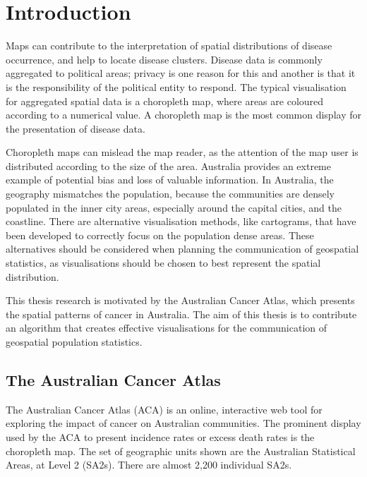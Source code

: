 \documentclass{monashthesis}
\begin{document}
\hypertarget{intro1}{%
\chapter{Introduction}\label{intro1}}

Maps can contribute to the interpretation of spatial distributions of disease occurrence, and help to locate disease clusters. Disease data is commonly aggregated to political areas; privacy is one reason for this and another is that it is the responsibility of the political entity to respond. The typical visualisation for aggregated spatial data is a choropleth map, where areas are coloured according to a numerical value. A choropleth map is the most common display for the presentation of disease data.

Choropleth maps can mislead the map reader, as the attention of the map user is distributed according to the size of the area. Australia provides an extreme example of potential bias and loss of valuable information. In Australia, the geography mismatches the population, because the communities are densely populated in the inner city areas, especially around the capital cities, and the coastline. There are alternative visualisation methods, like cartograms, that have been developed to correctly focus on the population dense areas. These alternatives should be considered when planning the communication of geospatial statistics, as visualisations should be chosen to best represent the spatial distribution.

This thesis research is motivated by the Australian Cancer Atlas, which presents the spatial patterns of cancer in Australia. The aim of this thesis is to contribute an algorithm that creates effective visualisations for the communication of geospatial population statistics.

\hypertarget{the-australian-cancer-atlas}{%
\section{The Australian Cancer Atlas}\label{the-australian-cancer-atlas}}

The Australian Cancer Atlas (ACA) is an online, interactive web tool for exploring the impact of cancer on Australian communities. The prominent display used by the ACA to present incidence rates or excess death rates is the choropleth map. The set of geographic units shown are the Australian Statistical Areas, at Level 2 (SA2s). There are almost 2,200 individual SA2s.
\end{document}
